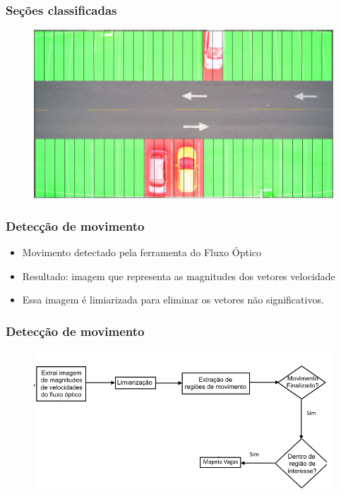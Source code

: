 \documentclass{beamer}
\begin{document}
\begin{frame}
\frametitle{Seções classificadas}
  \begin{figure}
	\centering
	\includegraphics[width=.8\textwidth]{Classificada}
	\centering
\end{figure}
\end{frame}

\begin{frame}
\frametitle{Detecção de movimento}
\begin{itemize}
\item Movimento detectado pela ferramenta do Fluxo Óptico
\item Resultado: imagem que representa as magnitudes dos vetores velocidade
\item Essa imagem é limiarizada para eliminar os vetores não significativos.
\end{itemize}
\end{frame}

\begin{frame}
\frametitle{Detecção de movimento}
\begin{figure}
	\centering
	\includegraphics[width=.8\textwidth]{fluxogramamovimento}
	\centering
\end{figure}
\end{frame}
\end{document}

